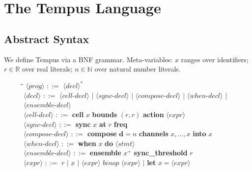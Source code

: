 \documentclass[twocolumn,10pt]{article}
\begin{document}
\section{The Tempus Language}
\label{sec:tempus}

\subsection{Abstract Syntax}

We define Tempus via a BNF grammar. Meta-variables: $x$ ranges over
identifiers; $r \in \mathbb{R}$ over real literals; $n \in \mathbb{N}$
over natural number literals.

\begin{figure}[ht]
\small
\begin{tabbing}
\hspace{1em}\=\hspace{0.5em}\=\kill
$\langle\mathit{prog}\rangle$  \> $::=$ \> $\langle\mathit{decl}\rangle^*$  \\[2pt]
$\langle\mathit{decl}\rangle$  \> $::=$ \>
  $\langle\mathit{cell\text{-}decl}\rangle$
  $\mid$ $\langle\mathit{sync\text{-}decl}\rangle$
  $\mid$ $\langle\mathit{compose\text{-}decl}\rangle$
  $\mid$ $\langle\mathit{when\text{-}decl}\rangle$
  $\mid$ $\langle\mathit{ensemble\text{-}decl}\rangle$\\[2pt]
$\langle\mathit{cell\text{-}decl}\rangle$ \> $::=$ \>
  \textbf{cell} $x$
  \textbf{bounds} $(r, r)$
  \textbf{action} $\langle\mathit{expr}\rangle$ \\[2pt]
$\langle\mathit{sync\text{-}decl}\rangle$ \> $::=$ \>
  \textbf{sync} $x$
  \textbf{at} $r$ \textbf{freq} \\[2pt]
$\langle\mathit{compose\text{-}decl}\rangle$ \> $::=$ \>
  \textbf{compose} $\mathbf{d}{=}n$
  \textbf{channels} $x, \ldots, x$
  \textbf{into} $x$ \\[2pt]
$\langle\mathit{when\text{-}decl}\rangle$ \> $::=$ \>
  \textbf{when} $x$ \textbf{do} $\langle\mathit{stmt}\rangle$ \\[2pt]
$\langle\mathit{ensemble\text{-}decl}\rangle$ \> $::=$ \>
  \textbf{ensemble} $x^+$
  \textbf{sync\_threshold} $r$ \\[2pt]
$\langle\mathit{expr}\rangle$ \> $::=$ \>
  $r$ $\mid$ $x$
  $\mid$ $\langle\mathit{expr}\rangle$ $\mathit{binop}$
  $\langle\mathit{expr}\rangle$
  $\mid$ \textbf{let} $x = \langle\mathit{expr}\rangle$

\end{tabbing}
\end{figure}
\end{document}
